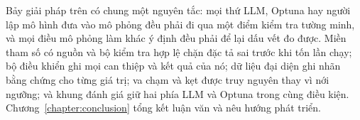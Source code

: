 \documentclass[../main.tex]{subfiles}
\begin{document}
Bảy giải pháp trên có chung một nguyên tắc: mọi thứ LLM, Optuna hay người lập mô hình đưa vào mô phỏng đều phải đi qua một điểm kiểm tra tường minh, và mọi điều mô phỏng làm khác ý định đều phải để lại dấu vết đo được. Miền tham số có nguồn và bộ kiểm tra hợp lệ chặn đặc tả sai trước khi tốn lần chạy; bộ điều khiển ghi mọi can thiệp và kết quả của nó; dữ liệu đại diện ghi nhãn bằng chứng cho từng giá trị; va chạm và kẹt được truy nguyên thay vì nới ngưỡng; và khung đánh giá giữ hai phía LLM và Optuna trong cùng điều kiện. Chương~\ref{chapter:conclusion} tổng kết luận văn và nêu hướng phát triển.
\end{document}
